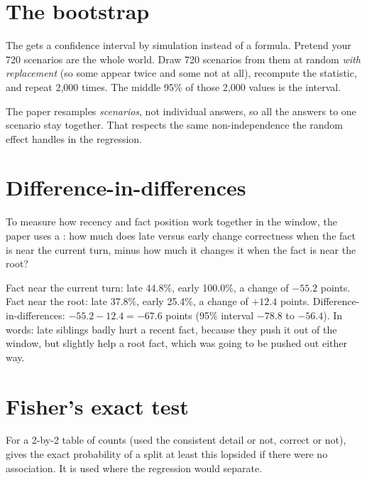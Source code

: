 \section{The bootstrap}

The  gets a confidence interval by simulation instead of a formula. Pretend your 720 scenarios are the whole world. Draw 720 scenarios from them at random \emph{with replacement} (so some appear twice and some not at all), recompute the statistic, and repeat 2,000 times. The middle 95\% of those 2,000 values is the interval.

\begin{why}
The paper resamples \emph{scenarios}, not individual answers, so all the answers to one scenario stay together. That respects the same non-independence the random effect handles in the regression.
\end{why}

\section{Difference-in-differences}

To measure how recency and fact position work together in the window, the paper uses a : how much does late versus early change correctness when the fact is near the current turn, minus how much it changes it when the fact is near the root?

\begin{example}
Fact near the current turn: late 44.8\%, early 100.0\%, a change of $-55.2$ points. Fact near the root: late 37.8\%, early 25.4\%, a change of $+12.4$ points. Difference-in-differences: $-55.2 - 12.4 = -67.6$ points (95\% interval $-78.8$ to $-56.4$). In words: late siblings badly hurt a recent fact, because they push it out of the window, but slightly help a root fact, which was going to be pushed out either way.
\end{example}

\section{Fisher's exact test}

For a 2-by-2 table of counts (used the consistent detail or not, correct or not),  gives the exact probability of a split at least this lopsided if there were no association. It is used where the regression would separate.
